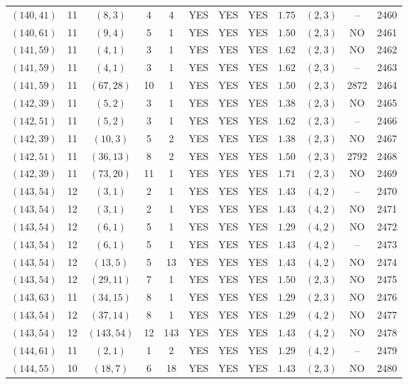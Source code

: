 \begin{longtable}{|c|c|c|c|c|c|c|c|c|c|c|c|}
$(140,41)$ & 11 & $(8,3)$ & 4 & 4 & YES & YES & YES & $1.75$ & $(2,3)$ & -- & 2460\\
$(140,61)$ & 11 & $(9,4)$ & 5 & 1 & YES & YES & YES & $1.50$ & $(2,3)$ & NO & 2461\\
$(141,59)$ & 11 & $(4,1)$ & 3 & 1 & YES & YES & YES & $1.62$ & $(2,3)$ & NO & 2462\\
$(141,59)$ & 11 & $(4,1)$ & 3 & 1 & YES & YES & YES & $1.62$ & $(2,3)$ & -- & 2463\\
$(141,59)$ & 11 & $(67,28)$ & 10 & 1 & YES & YES & YES & $1.50$ & $(2,3)$ & 2872 & 2464\\
$(142,39)$ & 11 & $(5,2)$ & 3 & 1 & YES & YES & YES & $1.38$ & $(2,3)$ & NO & 2465\\
$(142,51)$ & 11 & $(5,2)$ & 3 & 1 & YES & YES & YES & $1.62$ & $(2,3)$ & -- & 2466\\
$(142,39)$ & 11 & $(10,3)$ & 5 & 2 & YES & YES & YES & $1.38$ & $(2,3)$ & NO & 2467\\
$(142,51)$ & 11 & $(36,13)$ & 8 & 2 & YES & YES & YES & $1.50$ & $(2,3)$ & 2792 & 2468\\
$(142,39)$ & 11 & $(73,20)$ & 11 & 1 & YES & YES & YES & $1.71$ & $(2,3)$ & NO & 2469\\
$(143,54)$ & 12 & $(3,1)$ & 2 & 1 & YES & YES & YES & $1.43$ & $(4,2)$ & -- & 2470\\
$(143,54)$ & 12 & $(3,1)$ & 2 & 1 & YES & YES & YES & $1.43$ & $(4,2)$ & NO & 2471\\
$(143,54)$ & 12 & $(6,1)$ & 5 & 1 & YES & YES & YES & $1.29$ & $(4,2)$ & NO & 2472\\
$(143,54)$ & 12 & $(6,1)$ & 5 & 1 & YES & YES & YES & $1.43$ & $(4,2)$ & -- & 2473\\
$(143,54)$ & 12 & $(13,5)$ & 5 & 13 & YES & YES & YES & $1.43$ & $(4,2)$ & NO & 2474\\
$(143,54)$ & 12 & $(29,11)$ & 7 & 1 & YES & YES & YES & $1.50$ & $(2,3)$ & NO & 2475\\
$(143,63)$ & 11 & $(34,15)$ & 8 & 1 & YES & YES & YES & $1.29$ & $(2,3)$ & NO & 2476\\
$(143,54)$ & 12 & $(37,14)$ & 8 & 1 & YES & YES & YES & $1.29$ & $(4,2)$ & NO & 2477\\
$(143,54)$ & 12 & $(143,54)$ & 12 & 143 & YES & YES & YES & $1.43$ & $(4,2)$ & NO & 2478\\
$(144,61)$ & 11 & $(2,1)$ & 1 & 2 & YES & YES & YES & $1.29$ & $(4,2)$ & -- & 2479\\
$(144,55)$ & 10 & $(18,7)$ & 6 & 18 & YES & YES & YES & $1.43$ & $(2,3)$ & NO & 2480\\

\end{longtable}
